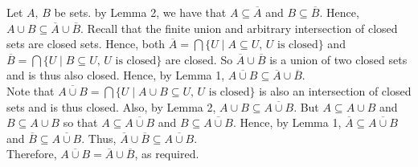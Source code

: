 \documentclass[twocolumn]{article}
\begin{document}
\begin{enumerate}
	Let $A,\, B$ be sets. 
	by Lemma 2, we have that $A \subseteq \overline{A}$ and $B \subseteq \overline{B}$. Hence, $A \cup B \subseteq \overline{A} \cup \overline{B}$. Recall that the finite union and arbitrary intersection of closed sets are closed sets. Hence, both $\overline{A} = \bigcap \{ U \mid A \subseteq U \text{, } U \text{ is closed} \}$ and $\overline{B} = \bigcap \{ U \mid B \subseteq U \text{, } U \text{ is closed} \}$ are closed. So $\overline{A} \cup \overline{B}$ is a union of two closed sets and is thus also closed. Hence, by Lemma 1, $\overline{A \cup B} \subseteq \overline{A} \cup \overline{B}$. \\
	Note that $\overline{A \cup B} = \bigcap \{ U \mid A \cup B \subseteq U \text{, } U \text{ is closed} \}$ is also an intersection of closed sets and is thus closed. Also, by Lemma 2, $A \cup B \subseteq \overline{A \cup B}$. But $A \subseteq A \cup B$ and $B \subseteq A \cup B$ so that $A \subseteq \overline{A \cup B}$ and $B \subseteq \overline{A \cup B}$. Hence, by Lemma 1, $\overline{A} \subseteq \overline{A \cup B}$ and $\overline{B} \subseteq \overline{A \cup B}$. Thus, $\overline{A} \cup \overline{B} \subseteq \overline{A \cup B}$. \\
	Therefore, $\overline{A \cup B} = \overline{A} \cup \overline{B}$, as required.
	

\end{enumerate}
\end{document}
